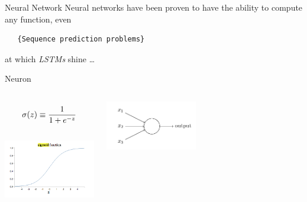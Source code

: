 \documentclass[10pt]{beamer}
\begin{document}
\begin{frame}[fragile]{Neural Network}
  Neural networks have been proven to have the ability to compute any function, even

  \begin{verbatim}   {Sequence prediction problems}\end{verbatim}

  at which \emph{LSTMs} shine \ldots
\end{frame}

\begin{frame}[fragile]{Neuron}
\begin{columns}[b]
		\begin{equation*}   
  		 \Huge\sigma (z) \equiv  \frac{1}{1+ e^ {-z}}
 		 \end{equation*}
		 \\
		\includegraphics[width=4cm]{src/sigmoidplot.png}
			
		
		
		
		\includegraphics[width=4cm]{src/sigmoid.png} 

			\par
		

	\end{columns}

\end{frame}
\end{document}
